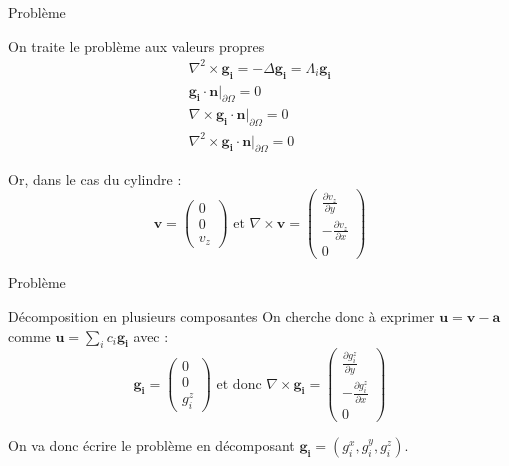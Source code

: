 \documentclass{beamer}
\newcommand{\laplace}{{\Delta}}
\newcommand{\rot}{{\nabla\times}}
\newcommand{\rott}{{\nabla^2\times}}
\newcommand{\restr}{{\big\rvert_{\partial\Omega}}}
\begin{document}
\begin{frame}{Problème}
\begin{block}{On traite le problème aux valeurs propres}
\[
\begin{aligned}
\rott \mathbf{g_i} = -\laplace\bm{g_i} = \Lambda_i\mathbf{g_i}\\
\mathbf{g_i}\cdot \mathbf{n}\restr = 0\\
\rot \mathbf{g_i}\cdot \mathbf{n}\restr = 0\\
\rott \mathbf{g_i}\cdot \mathbf{n}\restr = 0
\end{aligned}
\]
\end{block}

Or, dans le cas du cylindre :
\[
\bm{v}=\begin{pmatrix}
0\\
0\\
v_z
\end{pmatrix}
\text{ et }
\rot \bm{v} = \begin{pmatrix}
\frac{\partial v_z}{\partial y}\\
-\frac{\partial v_z}{\partial x}\\
0
\end{pmatrix}
\]
\end{frame}

\begin{frame}{Problème}
\begin{block}{Décomposition en plusieurs composantes}
On cherche donc à exprimer $\bm{u}=\bm{v}-\bm{a}$ comme $\bm{u}=\sum_i c_i\bm{g_i}$ avec :
\[
\bm{g_i}=\begin{pmatrix}
0\\
0\\
g_i^z
\end{pmatrix}
\text{ et donc }
\rot\bm{g_i}=\begin{pmatrix}
\frac{\partial g_i^z}{\partial y}\\
-\frac{\partial g_i^z}{\partial x}\\
0
\end{pmatrix}
\]
\end{block}
On va donc écrire le problème en décomposant $\bm{g_i}=(g_i^x,g_i^y,g_i^z)$.
\end{frame}
\end{document}
